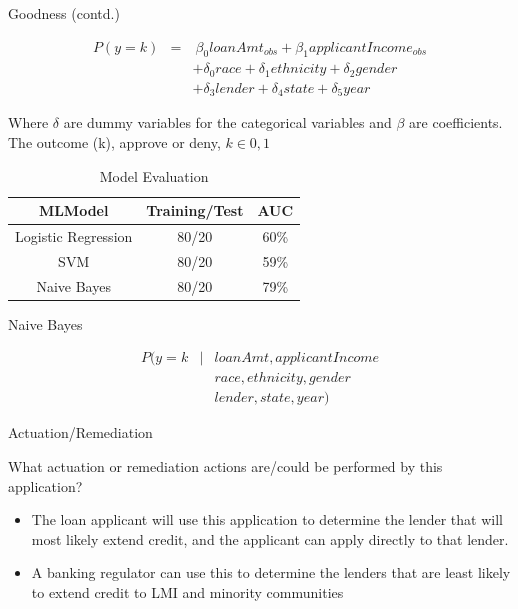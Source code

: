 \documentclass{beamer}
\begin{document}
\begin{frame}{Goodness (contd.)}

\begin{eqnarray*}
P(y=k) & = & \ \beta_0 loanAmt_{obs}  + \beta_1 applicantIncome_{obs} \\
& & + \delta_0 race + \delta_1 ethnicity  + \delta_2 gender  \\
& & + \delta_3 lender  +  \delta_4 state + \delta_5 year
\end{eqnarray*}

Where $\delta$ are dummy variables for the categorical variables and $\beta$ are coefficients. The outcome (k), approve or deny, $k \in 0,1$

\begin{table}[]
\begin{tabular}{|c|c|c|}
\hline
\textbf{MLModel}    & \textbf{Training/Test} & \textbf{AUC} \\ \hline
Logistic Regression & 80/20                  & 60\%         \\ \hline
SVM                 & 80/20                  & 59\%         \\ \hline
Naive Bayes         & 80/20                  & 79\%         \\ \hline
\end{tabular}
\caption{Model Evaluation}
\label{tab:my-table}
\end{table}



\end{frame}

\begin{frame}{Naive Bayes}

\begin{eqnarray*}
  P(y=k & | & loanAmt, applicantIncome \\
& & race, ethnicity, gender  \\
& & lender, state, year)
\end{eqnarray*}

\end{frame}


\begin{frame}{Actuation/Remediation}

What actuation or remediation actions are/could be performed by this application?  \vspace{3mm}

\begin{itemize}
  \item The loan applicant will use this application to determine the lender that will most likely extend credit, and the applicant can apply directly to that lender. 
  \item A banking regulator can use this to determine the lenders that are least likely to extend credit to LMI and minority communities 
\end{itemize}


\end{frame}
\end{document}
